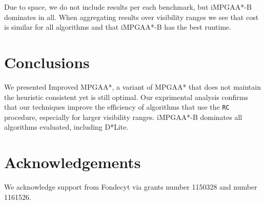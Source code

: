 \documentclass{article}
\begin{document}
Due to space, we do not include results per each benchmark, but iMPGAA*-B dominates in all. When aggregating results over visibility ranges we see that cost is similar for all algorithms and that iMPGAA*-B has the best runtime.   

\section{Conclusions}
We presented Improved MPGAA*, a variant of MPGAA* that does not maintain the heuristic consistent yet is still optimal. Our exprimental analysis confirms that our techniques improve the efficiency of algorithms that use the \texttt{RC} procedure, especially for larger visibility ranges.  iMPGAA*-B dominates all algorithms evaluated, including D*Lite. %


\section*{Acknowledgements}
We acknowledge support from Fondecyt via grants number 1150328 and number 1161526.



\end{document}
